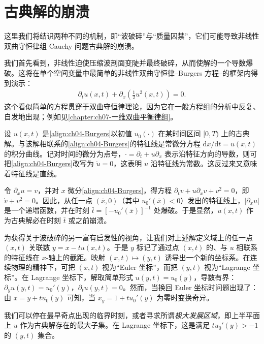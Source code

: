 ﻿\documentclass[../../main.tex]{subfiles}
\begin{document}
\section{古典解的崩溃}\label{section:ch04-经典解的崩溃}

这里我们将结识两种不同的机制，即“波破碎”与“质量囚禁”，它们可能导致非线性双曲守恒律组 Cauchy 问题古典解的崩溃。

我们首先看到，非线性迫使压缩波剖面变陡并最终破碎，从而使解的一个导数爆破。这将在单个空间变量中最简单的非线性双曲守恒律--Burgers 方程--的框架内得到演示：
\begin{align}
\partial_{t}u(x,t)+\partial_{x}\left(\tfrac{1}{2}u^{2}(x,t)\right)=0.
\label{align:ch04-Burgers}
\end{align}
这个看似简单的方程贯穿于双曲守恒律理论，因为它在一般方程组的分析中反复、自发地出现；例如见\cref{chapter:ch07-一维双曲平衡律组}。


设 $u(x,t)$ 是\eqref{align:ch04-Burgers}以初值 $u_{0}(\cdot)$ 在某时间区间 $[0,T)$ 上的古典解。与该解相联系的\eqref{align:ch04-Burgers}的特征线是常微分方程 $\mathrm{d}x/\mathrm{d}t=u(x,t)$ 的积分曲线。记对时间的微分为点号，$\cdot=\partial_{t}+u\partial_{x}$ 表示沿特征方向的导数，则可把\eqref{align:ch04-Burgers}改写为 $\dot{u}=0$，这表明 $u$ 沿特征线为常数。这反过来又意味着特征线是直线。

令 $\partial_{x}u=v$，并对 $x$ 微分\eqref{align:ch04-Burgers}，得方程 $\partial_{t}v+u\partial_{x}v+v^{2}=0$，即 $\dot{v}+v^{2}=0$。因此，从任一点 $(\bar{x},0)$（其中 $u_{0}'(\bar{x})<0$）发出的特征线上，$|\partial_{x}u|$ 是一个递增函数，并在时刻 $\bar{t}=[-u_{0}'(\bar{x})]^{-1}$ 处爆破。于是显然，$u(x,t)$ 作为古典解必在时刻 $\bar{t}$ 或之前崩溃。

为获得关于波破碎的另一富有启发性的视角，让我们对上述解定义域上的任一点 $(x,t)$ 关联数 $y=x-tu(x,t)$。于是 $y$ 标记了通过点 $(x,t)$ 的、与 $u$ 相联系的特征线在 $x$-轴上的截距。映射 $(x,t)\mapsto(y,t)$ 诱导出一个新的坐标系。在连续物理的精神下，可把 $(x,t)$ 视为“Euler 坐标”，而把 $(y,t)$ 视为“Lagrange 坐标”。在 Lagrange 坐标下，解取简单形式 $u(y,t)=u_{0}(y)$，导数有界：$\partial_{y}u(y,t)=u_{0}'(y)$，$\partial_{t}u(y,t)=0$。然而，当换回 Euler 坐标时问题出现了：由 $x=y+tu_{0}(y)$ 可知，当 $x_{y}=1+tu_{0}'(y)$ 为零时变换奇异。

我们可以停在最早奇点出现的临界时刻，或者寻求所谓\emph{极大发展区域}，即上半平面上 $u$ 作为古典解存在的最大子集。在 Lagrange 坐标下，这是满足 $tu_{0}'(y)>-1$ 的 $(y,t)$ 集合。
\end{document}
